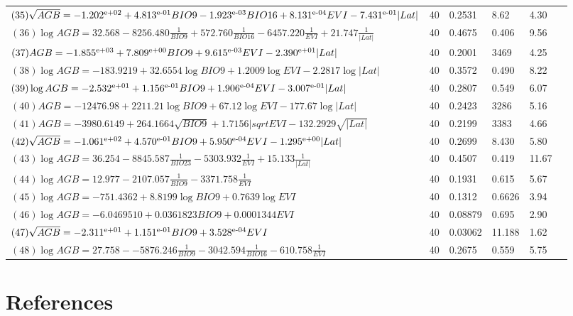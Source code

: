 \documentclass[review, authoryear]{elsarticle}   	%
\begin{document}
\begin{table}[htbp]
\begin{tabular}{p{8cm}p{0.5cm}p{1.0cm}p{1.0cm}p{1.0cm}p{1.0cm}}
$(35)\sqrt{AGB}=-1.202\textsuperscript{e+02}+4.813\textsuperscript{e-01}BIO9-1.923\textsuperscript{e-03}BIO16+8.131\textsuperscript{e-04}EVI-7.431\textsuperscript{e-01}|Lat|$&40&0.2531&8.62&4.30&\\
$(36)\log{AGB}=32.568-8256.480\frac{1}{BIO9}+572.760\frac{1}{BIO16}-6457.220\frac{1}{EVI}+21.747\frac{1}{|Lat|}$&40&0.4675&0.406&9.56&\\ 
$(37)AGB=-1.855\textsuperscript{e+03}+7.809\textsuperscript{e+00}BIO9+9.615\textsuperscript{e-03}EVI-2.390\textsuperscript{e+01}|Lat|$&40&0.2001&3469&4.25&\\
$(38)\log{AGB}=-183.9219+32.6554\log{BIO9}+1.2009\log{EVI}-2.2817\log{|Lat|}$&40&0.3572&0.490&8.22&\\
$(39)\log{AGB}=-2.532\textsuperscript{e+01}+1.156\textsuperscript{e-01}BIO9+1.906\textsuperscript{e-04}EVI-3.007\textsuperscript{e-01}|Lat|$&40&0.2807&0.549&6.07&\\
$(40)AGB=-12476.98+2211.21\log{BIO9}+67.12\log{EVI}-177.67\log{|Lat|}$&40&0.2423&3286&5.16&\\ 
$(41)AGB=-3980.6149+264.1664\sqrt{BIO9}+1.7156|sqrt{EVI}-132.2929\sqrt{|Lat|}$&40&0.2199&3383&4.66&\\
$(42)\sqrt{AGB}=-1.061\textsuperscript{e+02}+4.570\textsuperscript{e-01}BIO9+5.950\textsuperscript{e-04}EVI-1.295\textsuperscript{e+00}|Lat|$&40&0.2699&8.430&5.80&\\
$(43)\log{AGB}=36.254-8845.587\frac{1}{BIO23}-5303.932\frac{1}{EVI}+15.133\frac{1}{|Lat|}$&40&0.4507&0.419&11.67&\\
$(44)\log{AGB}=12.977-2107.057\frac{1}{BIO9}-3371.758\frac{1}{EVI}$ &40&0.1931&0.615&5.67&\\
$(45)\log{AGB}=-751.4362+8.8199\log{BIO9}+0.7639\log{EVI}$&40&0.1312&0.6626&3.94&\\
$(46)\log{AGB}=-6.0469510+0.0361823BIO9+0.0001344EVI$&40&0.08879&0.695&2.90&\\
$(47)\sqrt{AGB}=-2.311\textsuperscript{e+01}+1.151\textsuperscript{e-01}BIO9+3.528\textsuperscript{e-04}EVI$&40&0.03062&11.188&1.62&\\   
$(48)\log{AGB}=27.758--5876.246\frac{1}{BIO9}-3042.594\frac{1}{BIO16}-610.758\frac{1}{EVI}$ &40&0.2675&0.559&5.75&\\
      \bottomrule
  \end{tabular}
   \label{tab:models}
\end{table}


\section*{References}


%
\end{document}
